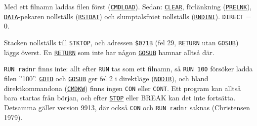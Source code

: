 \begin{Listing}
\Gap
{}
\begin{Note}\par\noindent Med ett filnamn laddas filen först (\hyperlink{l:CMDLOAD}{\texttt{CMDLOAD}}). Sedan: \hyperlink{l:CLEAR}{\texttt{CLEAR}}, förlänkning (\hyperlink{l:PRELNK}{\texttt{PRELNK}}), \hyperlink{l:DATA}{\texttt{DATA}}-pekaren nollställs (\hyperlink{l:RSTDAT}{\texttt{RSTDAT}}) och slumptalsfröet nollställs (\hyperlink{l:RNDINI}{\texttt{RNDINI}}). \texttt{DIRECT} = 0.\par
\par\noindent Stacken nollställs till \hyperlink{v:STKTOP}{\texttt{STKTOP}}, och adressen \hyperlink{a:071B}{\texttt{\$071B}} (fel 29, \hyperlink{l:RETURN}{\texttt{RETURN}} utan \hyperlink{l:GOSUB}{\texttt{GOSUB}}) läggs överst. En \hyperlink{l:RETURN}{\texttt{RETURN}} som inte har någon \hyperlink{l:GOSUB}{\texttt{GOSUB}} hamnar alltså där.\par
\par\noindent \texttt{RUN radnr} finns inte: allt efter \texttt{RUN} tas som ett filnamn, så \texttt{RUN 100} försöker ladda filen ”100”. \hyperlink{l:GOTO}{\texttt{GOTO}} och \hyperlink{l:GOSUB}{\texttt{GOSUB}} ger fel 2 i direktläge (\hyperlink{l:NODIR}{\texttt{NODIR}}), och bland direktkommandona (\hyperlink{l:CMDKW}{\texttt{CMDKW}}) finns ingen \texttt{CON} eller \texttt{CONT}. Ett program kan alltså bara startas från början, och efter \hyperlink{l:STOP}{\texttt{STOP}} eller BREAK kan det inte fortsätta. Detsamma gäller version 9913, där också \texttt{CON} och \texttt{RUN radnr} saknas (Christensen 1979).\par\end{Note}

\end{Listing}

